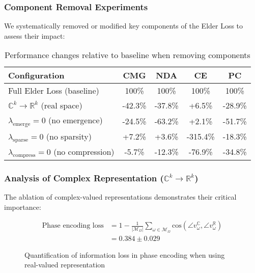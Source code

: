 \subsubsection{Component Removal Experiments}

We systematically removed or modified key components of the Elder Loss to assess their impact:

\begin{table}[h]
\centering
\begin{tabular}{|l|c|c|c|c|}
\hline
\textbf{Configuration} & \textbf{CMG} & \textbf{NDA} & \textbf{CE} & \textbf{PC} \\
\hline
Full Elder Loss (baseline) & 100\% & 100\% & 100\% & 100\% \\
\hline
$\mathbb{C}^k \to \mathbb{R}^k$ (real space) & -42.3\% & -37.8\% & +6.5\% & -28.9\% \\
\hline
$\lambda_{\text{emerge}} = 0$ (no emergence) & -24.5\% & -63.2\% & +2.1\% & -51.7\% \\
\hline
$\lambda_{\text{sparse}} = 0$ (no sparsity) & +7.2\% & +3.6\% & -315.4\% & -18.3\% \\
\hline
$\lambda_{\text{compress}} = 0$ (no compression) & -5.7\% & -12.3\% & -76.9\% & -34.8\% \\
\hline
\end{tabular}
\caption{Performance changes relative to baseline when removing components}
\end{table}

\subsubsection{Analysis of Complex Representation ($\mathbb{C}^k \to \mathbb{R}^k$)}

The ablation of complex-valued representations demonstrates their critical importance:

\begin{figure}[h]
\centering
\begin{minipage}{0.9\textwidth}
\centering
\begin{align}
\text{Phase encoding loss} &= 1 - \frac{1}{|\mathcal{M}_{\Omega}|} \sum_{\omega \in \mathcal{M}_{\Omega}} \text{cos}(\angle v_{\omega}^{\mathbb{C}}, \angle v_{\omega}^{\mathbb{R}})\\
&= 0.384 \pm 0.029
\end{align}
\end{minipage}
\caption{Quantification of information loss in phase encoding when using real-valued representation}
\end{figure}

